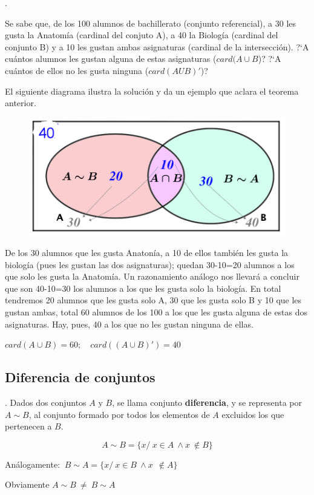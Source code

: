 \begin{example}
	. \begin{small}
	Se sabe que, de los 100 alumnos de bachillerato (conjunto referencial), a 30 les gusta la Anatomía (cardinal del conjuto A), a 40 la Biología (cardinal del conjunto B) y a 10 les gustan ambas asignaturas (cardinal de la intersección).	 ?`A cuántos alumnos les gustan alguna de estas asignaturas ($card(A\cup B$)? ?`A cuántos de ellos no les gusta ninguna ($card(AUB)'$)? 
	
	El siguiente diagrama ilustra la solución y da un ejemplo que aclara el teorema anterior.

	\begin{figure}[H]
	\centering
	\includegraphics[width=.6\textwidth]{imagenes/apendices/app07.png}
	\end{figure}
	
	De los 30 alumnos que les gusta Anatonía, a 10 de ellos también les gusta la biología (pues les gustan las dos asignaturas); quedan 30-10=20 alumnos a los que solo les gusta la Anatomía. Un razonamiento análogo nos llevará a concluir que son 40-10=30 los alumnos a los que les gusta solo la biología. En total tendremos 20 alumnos que les gusta solo A, 30 que les gusta solo B y 10 que les gustan ambas, total 60 alumnos de los 100 a los que les gusta alguna de estas dos asignaturas. Hay, pues, 40 a los que no les gustan ninguna de ellas. 
	
	$card(A\cup B)=60;\quad card((A\cup B)')=40$
	\end{small}
\end{example}




\subsection{Diferencia de conjuntos}

\begin{definition}
	. Dados dos conjuntos $A \text{ y } B$, se llama conjunto \textbf{diferencia}, y se representa por $A\sim B$, al conjunto formado por todos los elementos de $A$ excluidos los que pertenecen a $B$.
	
	\vspace{-4mm} $$A\sim B=\{x/\ x\in A \ \wedge x \ \notin B\}	$$
	
	Análogamente: $\ B\sim A=\{x/\ x\in B \ \wedge x \ \ \notin A\}$
	
	\vspace{2mm} Obviamente $A\sim B \ \neq	\ B\sim A$
\end{definition}

